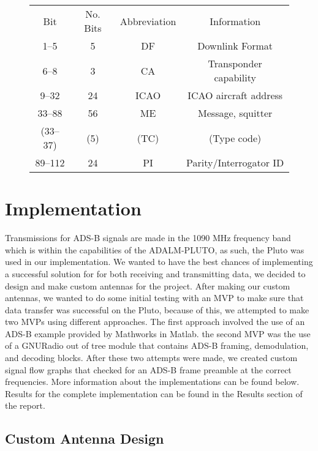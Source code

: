 \documentclass[conference]{IEEEtran}
\begin{document}
\begin{figure}
\begin{center}
\begin{tabular}{ | c | c | c | c | }
  Bit & No. Bits & Abbreviation & Information \\ 
  1–5 & 5 & DF & Downlink Format \\
  6–8 & 3 & CA & Transponder capability \\
  9–32 & 24 & ICAO & ICAO aircraft address \\
  33–88 & 56 & ME & Message, squitter \\
  (33–37) & (5) & (TC) & (Type code) \\
  89–112 & 24 & PI & Parity/Interrogator ID
\end{tabular}
\end{center}
\caption{}\label{fig:ads-b-bits}
\end{figure}

\section{Implementation}

Transmissions for ADS-B signals are made in the 1090 MHz frequency band which is within the capabilities of the ADALM-PLUTO, as such, the Pluto was used in our implementation. 
We wanted to have the best chances of implementing a successful solution for for both receiving and transmitting data, we decided to design and make custom antennas for the project.
After making our custom antennas, we wanted to do some initial testing with an MVP to make sure that data transfer was successful on the Pluto, because of this, we attempted to make two MVPs using different approaches.
The first approach involved the use of an ADS-B example provided by Mathworks in Matlab.
the second MVP was the use of a GNURadio out of tree module that contains ADS-B framing, demodulation, and decoding blocks.
After these two attempts were made, we created custom signal flow graphs that checked for an ADS-B frame preamble at the correct frequencies.
More information about the implementations can be found below.
Results for the complete implementation can be found in the Results section of the report.

\subsection{Custom Antenna Design}
\end{document}
